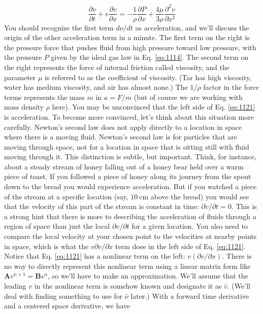 \begin{equation}\label{eq:1121}
\frac{\partial v}{\partial t}+v \frac{\partial v}{\partial x}=-\frac{1}{\rho} \frac{\partial P}{\partial x}+\frac{4 \mu}{3 \rho} \frac{\partial^{2} v}{\partial x^{2}}
\end{equation}
You should recognize the first term $d \nu / d t$ as acceleration, and we\rq ll discuss the origin of the other acceleration term in a minute. The first term on the right is the pressure force that pushes fluid from high pressure toward low pressure, with the pressure $P$ given by the ideal gas law in Eq. \ref{eq:1114}. The second term on the right represents the force of internal friction called viscosity, and the parameter $\mu$ is referred to as the coefficient of viscosity. (Tar has high viscosity, water has medium viscosity, and air has almost none.) The $1 / \rho$ factor in the force terms represents the mass $m$ in $a=F / m$ (but of course we are working with mass density $\rho$ here).
You may be unconvinced that the left side of Eq. \ref{eq:1121} is acceleration. To become more convinced, let\rq s think about this situation more carefully. Newton\rq s second law does not apply directly to a location in space where there is a moving fluid. Newton\rq s second law is for particles that are moving through space, not for a location in space that is sitting still with fluid moving through it. This distinction is subtle, but important. Think, for instance, about a steady stream of honey falling out of a honey bear held over a warm piece of toast. If you followed a piece of honey along its journey from the spout down to the bread you would experience acceleration. But if you watched a piece of the stream at a specific location (say, $10 \mathrm{~cm}$ above the bread) you would see that the velocity of this part of the stream is constant in time: $\partial v / \partial t=0$. This is a strong hint that there is more to describing the acceleration of fluids through a region of space than just the local $\partial v / \partial t$ for a given location. You also need to compare the local velocity at your chosen point to the velocities at nearby points in space, which is what the $v \partial v / \partial x$ term does in the left side of Eq. \ref{eq:1121}.
Notice that Eq. \ref{eq:1121} has a nonlinear term on the left: $v(\partial v / \partial x)$. There is no way to directly represent this nonlinear term using a linear matrix form like $\mathbf{A} v^{n+1}=\mathbf{B} v^{n}$, so we'll have to make an approximation. We\rq ll assume that the leading $v$ in the nonlinear term is somehow known and designate it as $\bar{v}$. (We\rq ll deal with finding something to use for $\bar{\nu}$ later.) With a forward time derivative and a centered space derivative, we have


